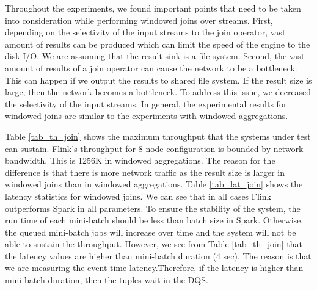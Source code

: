{Throughout the experiments, we found important points that need to be taken into consideration while performing windowed joins over streams. First, depending on the selectivity of the input streams to the join operator, vast amount of results can be produced which can limit the speed of the engine to the disk I/O. We are assuming that the result sink is a file system. Second, the vast amount of results of a join operator can cause the network to be a bottleneck. This can happen if we output the results to shared file system. If the result size is large, then the network becomes a bottleneck. To address this issue, we decreased the selectivity of the input streams.  In general, the experimental results for windowed joins are similar to the experiments with windowed aggregations. 

Table \ref{tab_th_join} shows the maximum throughput that the systems under test can sustain.  Flink's throughput for 8-node configuration is bounded by network bandwidth. This is 1256K in windowed aggregations. The reason for the difference is that there is more network traffic as the result size is larger in windowed joins than in windowed aggregations. Tab\-le \ref{tab_lat_join} shows the latency statistics for windowed joins. We can see that  
in all cases Flink outperforms Spark in all parameters. To ensure the stability of the system, the run time of each mini-batch should be less than batch size in Spark. Otherwise, the queued mini-batch jobs will increase over time and the system will not be able to sustain the throughput. However, we see from Table \ref{tab_th_join} that the latency values are higher than mini-batch duration (4 sec). The reason is that we are measuring the event time latency.Therefore, if the latency is higher than mini-batch duration, then the tuples wait in the DQS.

























































}
